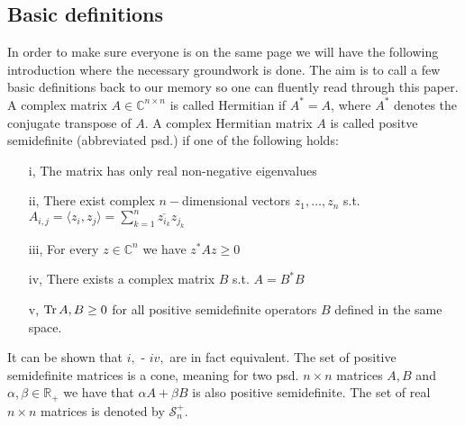 \subsection{Basic definitions}
In order to make sure everyone is on the same page we will have the following introduction where the necessary groundwork is done. The aim is to call a few basic definitions back to our memory so one can fluently read through this paper. \\
A complex matrix $A \in \mathbb{C}^{n \times n}$ is called Hermitian if $A^*=A$, where $A^*$ denotes the conjugate transpose of $A$. A complex Hermitian matrix $A$ is called positve semidefinite (abbreviated psd.) if one of the following holds: 
\begin{enumerate}
\item[i,] The matrix has only real non-negative eigenvalues 
\item[ii,] There exist complex $n-$dimensional vectors $z_1, \dots, z_n$ s.t. $A_{i,j} = \langle z_i, z_j \rangle = \sum_{k=1}^n \overline{z_{i_k}}z_{j_k}$
\item[iii,] For every $z \in \mathbb{C}^n$ we have $z^*Az\ge 0$
\item[iv,] There exists a complex matrix $B$ s.t. $A=B^*B$
\item[v,] $\text{Tr} \, {A,B}  \ge 0 $ for all positive semidefinite operators $ B $ defined in the same space. 
\end{enumerate}
It can be shown that $i,$ - $iv,$ are in fact equivalent. The set of positive semidefinite matrices is a cone, meaning for two psd. $n \times n$ matrices $A,B$ and $\alpha, \beta \in \mathbb{R}_+$ we have that $\alpha A + \beta B $ is also positive semidefinite. The set of real $n \times n$ matrices is denoted by $\mathcal{S}_n^+$.\\
